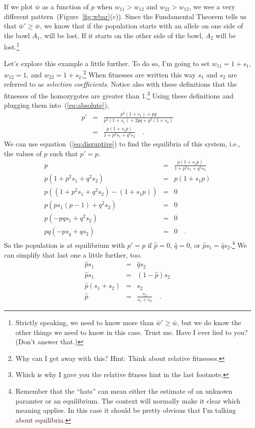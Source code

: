 \documentclass[12pt]{article}
\begin{document}
If we plot $\bar w$ as a function of $p$ when $w_{11} > w_{12}$ and
$w_{22} > w_{12}$, we wee a very different
pattern~(Figure~\ref{fig:wbar}(c)). Since the Fundamental Theorem
tells us that $\bar w' \ge \bar w$, we know that if the population
starts with an allele on one side of the bowl $A_1$, will be lost. If
it starts on the other side of the bowl, $A_2$ will be
lost.\footnote{Strictly speaking, we need to know more than $\bar w'
  \ge \bar w$, but we do know the other things we need to know in this
  case. Trust me. Have I ever lied to you? (Don't answer
  that.)}

Let's explore this example a little further. To do so, I'm going to
set $w_{11} = 1 + s_1$, $w_{12} = 1$, and $w_{22} = 1+
s_2$.\footnote{Why can I get away with this? Hint: Think about
  relative fitnesses.} When fitnesses are written this way $s_1$ and
$s_2$ are referred to as {\it selection coefficients}. Notice also
with these definitions that the fitnesses of the homozygotes are
greater than 1.\footnote{Which is why I gave you the relative fitness
  hint in the last footnote.} Using these definitions and plugging
them into~(\ref{eq:absolute}),
\begin{eqnarray}
p' &=& \frac{p^2(1+s_1) + pq}{p^2(1+s_1) + 2pq + q^2(1+s_2)} \nonumber
   \\
   &=& \frac{p(1 + s_1p)}{1 + p^2s_1 + q^2s_2} \quad . \label{eq:disruptive}
\end{eqnarray}
We can use equation~(\ref{eq:disruptive}) to find the equilibria of
this system, i.e., the values of $p$ such that $p' = p$.
\begin{eqnarray*}
p &=& \frac{p(1 + s_1p)}{1 + p^2s_1 + q^2s_2} \\
p(1 + p^2s_1 + q^2s_2) &=& p(1 + s_1p) \\
p\left((1 + p^2s_1 + q^2s_2) - (1 + s_1p)\right) &=& 0 \\
p\left(ps_1(p - 1) + q^2s_2\right) &=& 0 \\
p(-pqs_1 + q^2s_2) &=& 0 \\
pq(-ps_q + qs_2) &=& 0 \quad .
\end{eqnarray*}
So the population is at equilibrium with $p'=p$ if $\hat p=0$,
$\hat q=0$, or $\hat ps_1 = \hat qs_2$.\footnote{Remember that the
  ``hats'' can mean either the estimate of an unknown paramter or an
  equilibrium. The context will normally make it clear which meaning
  applies. In this case it should be pretty obvious that I'm talking
  about equilibria.} We can simplify that last one a little further,
too.
\begin{eqnarray*}
\hat ps_1 &=& \hat qs_2 \\
\hat ps_1 &=& (1-\hat p)s_2 \\
\hat p(s_1 + s_2) &=& s_2 \\
\hat p &=& \frac{s_2}{s_1+s_2} \quad .
\end{eqnarray*}
\end{document}
